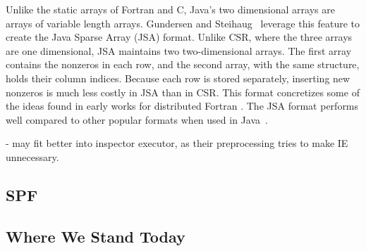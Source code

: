 Unlike the static arrays of Fortran and C, Java's two dimensional arrays are arrays of variable length arrays. 
Gundersen and Steihaug~\cite{gundersen2004data} leverage this feature to create the Java Sparse Array (JSA) format.
Unlike CSR, where the three arrays are one dimensional, JSA maintains two two-dimensional arrays. 
The first array contains the nonzeros in each row, and the second array, with the same structure, holds their column indices. 
Because each row is stored separately, inserting new nonzeros is much less costly in JSA than in CSR. 
This format concretizes some of the ideas found in early works for distributed Fortran .
The JSA format performs well compared to other popular formats when used in Java~\cite{lujan2005storage}.


\cite{ashcraft1999spooles}




\cite{fu1996run}
\cite{ujaldon1996parallelization}
- may fit better into inspector executor, as their preprocessing tries to make IE unnecessary.



\subsection{SPF}

\cite{strout2003compile}













\subsection{Where We Stand Today}





